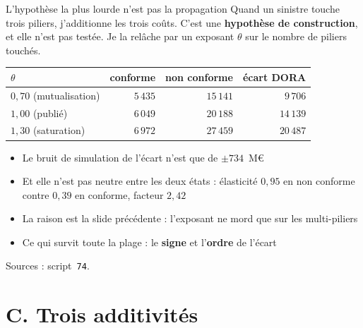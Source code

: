 \documentclass[11pt]{beamer}
\begin{document}
\begin{frame}{L'hypothèse la plus lourde n'est pas la propagation}
\small
Quand un sinistre touche trois piliers, j'additionne les trois coûts. C'est une
\textbf{hypothèse de construction}, et elle n'est pas testée. Je la relâche par un exposant
$\theta$ sur le nombre de piliers touchés.
\vspace{3mm}

\begin{center}\small
\begin{tabular}{@{}l r r r@{}}
\toprule
$\theta$ & \textbf{conforme} & \textbf{non conforme} & \textbf{écart DORA} \\
\midrule
$0{,}70$ (mutualisation) & $5\,435$ & $15\,141$ & $9\,706$ \\
$1{,}00$ (publié) & $6\,049$ & $20\,188$ & $14\,139$ \\
$1{,}30$ (saturation) & $6\,972$ & $27\,459$ & $20\,487$ \\
\bottomrule
\end{tabular}
\end{center}
\vspace{3mm}

\begin{itemize}\itemsep5pt
  \item Le bruit de simulation de l'écart n'est que de $\pm 734$~M\euro
  \item \alert{Et elle n'est pas neutre entre les deux états} : élasticité $0{,}95$ en non
        conforme contre $0{,}39$ en conforme, facteur $2{,}42$
  \item La raison est la slide précédente : l'exposant ne mord que sur les multi-piliers
  \item Ce qui survit toute la plage : le \textbf{signe} et l'\textbf{ordre} de l'écart
\end{itemize}
\vspace{2mm}
{\scriptsize Sources : script~\texttt{74}.}
\end{frame}

\section*{C. Trois additivités}
\end{document}
